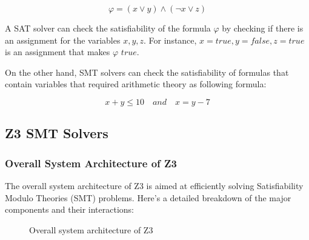 \documentclass[]{rptuseminar}
\begin{document}
\begin{equation}
  \varphi = (x \lor y) \land (\lnot x \lor z)
\end{equation}

A SAT solver can check the satisfiability of the formula \(\varphi\) by checking if there is an assignment for the variables \(x, y, z\).
For instance, \(x = true, y = false, z = true\) is an assignment that makes \(\varphi\) \(true\). 

On the other hand, SMT solvers can check the satisfiability of formulas that contain variables that required arithmetic theory as following formula:

\begin{equation}
  x + y \leq 10 \quad and \quad x = y - 7
\end{equation}

\subsection{Z3 SMT Solvers}
\subsubsection*{Overall System Architecture of Z3}
The overall system architecture of Z3 is aimed at eﬃciently solving Satisfiability Modulo Theories (SMT) problems. Here's a detailed breakdown of the major components and their interactions:

 \begin{figure}[ht]
  \begin{center}
  \end{center}
  \caption{%
     Overall system architecture of Z3
    \cite{nikolaj_bjorner_programming_nodate}
  }
  \label{fig:scholar} %
\end{figure}
\end{document}
